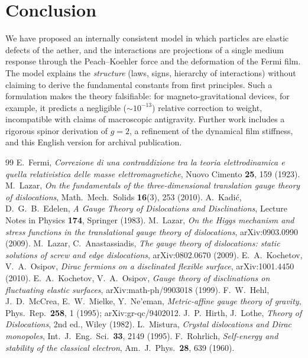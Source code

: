 \documentclass[12pt,a4paper]{article}
\begin{document}
\section{Conclusion}
We have proposed an internally consistent model in which particles are elastic
defects of the aether, and the interactions are projections of a single medium
response through the Peach--Koehler force and the deformation of the Fermi
film. The model explains the \emph{structure} (laws, signs, hierarchy of
interactions) without claiming to derive the fundamental constants from first
principles. Such a formulation makes the theory falsifiable: for
magneto-gravitational devices, for example, it predicts a negligible
($\sim\!10^{-13}$) relative correction to weight, incompatible with claims of
macroscopic antigravity. Further work includes a rigorous spinor derivation of
$g=2$, a refinement of the dynamical film stiffness, and this English version
for archival publication.

\begin{thebibliography}{99}
 E.~Fermi, \emph{Correzione di una contraddizione tra la teoria
elettrodinamica e quella relativistica delle masse elettromagnetiche},
Nuovo Cimento \textbf{25}, 159 (1923).
 M.~Lazar, \emph{On the fundamentals of the three-dimensional
translation gauge theory of dislocations}, Math.\ Mech.\ Solids \textbf{16}(3), 253 (2010).
 A.~Kadi\'c, D.~G.~B.~Edelen, \emph{A Gauge Theory of Dislocations
and Disclinations}, Lecture Notes in Physics \textbf{174}, Springer (1983).
 M.~Lazar, \emph{On the Higgs mechanism and stress functions in the
translational gauge theory of dislocations}, arXiv:0903.0990 (2009).
 M.~Lazar, C.~Anastassiadis, \emph{The gauge theory of dislocations:
static solutions of screw and edge dislocations}, arXiv:0802.0670 (2009).
 E.~A.~Kochetov, V.~A.~Osipov, \emph{Dirac fermions on a disclinated
flexible surface}, arXiv:1001.4450 (2010).
 E.~A.~Kochetov, V.~A.~Osipov, \emph{Gauge theory of disclinations on
fluctuating elastic surfaces}, arXiv:math-ph/9903018 (1999).
 F.~W.~Hehl, J.~D.~McCrea, E.~W.~Mielke, Y.~Ne'eman, \emph{Metric-affine
gauge theory of gravity}, Phys.\ Rep.\ \textbf{258}, 1 (1995); arXiv:gr-qc/9402012.
 J.~P.~Hirth, J.~Lothe, \emph{Theory of Dislocations}, 2nd ed.,
Wiley (1982).
 L.~Mistura, \emph{Crystal dislocations and Dirac monopoles},
Int.\ J.\ Eng.\ Sci.\ \textbf{33}, 2149 (1995).
 F.~Rohrlich, \emph{Self-energy and stability of the classical
electron}, Am.\ J.\ Phys.\ \textbf{28}, 639 (1960).
\end{thebibliography}
\end{document}
